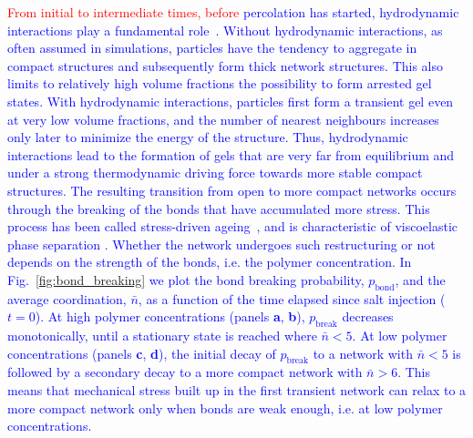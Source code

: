 \documentclass[preprint,amsmath,amssymb,superscriptaddress]{revtex4-1}
\begin{document}
\textcolor{blue}
{
\textcolor{red}{From initial to intermediate times, before} percolation has started, hydrodynamic interactions play a fundamental role~\cite{tanaka2000,tanaka2007spontaneous,furukawa2010key}.
Without hydrodynamic interactions, as often assumed in simulations, particles have the tendency to aggregate in compact structures and subsequently form thick network structures. This also limits to relatively high volume fractions the possibility to form arrested gel states. 
With hydrodynamic interactions, particles first form a transient gel even at very low volume fractions, and the number of nearest neighbours increases only later to minimize the energy of the structure. Thus, hydrodynamic interactions lead to the formation of gels that are very far from equilibrium and under a strong thermodynamic driving force towards more stable compact structures. The resulting transition from open to more compact networks occurs through the breaking of the bonds that have accumulated more stress. This process has been called stress-driven ageing~\cite{tanaka2007spontaneous}, and is characteristic of viscoelastic phase separation \cite{tanaka2000viscoelastic}. Whether the network undergoes such restructuring or not depends on the strength of the bonds, i.e. the polymer concentration.
In Fig.~\ref{fig:bond_breaking} we plot the bond breaking probability, $p_\text{bond}$, and the average coordination, $\bar{n}$, as a function of the time elapsed since salt injection ($t=0$).
At high polymer concentrations (panels \textbf{a}, \textbf{b}), $p_\text{break}$ decreases monotonically, until a stationary state is reached where $\bar{n}<5$.
At low polymer concentrations (panels \textbf{c}, \textbf{d}), the initial decay of $p_\text{break}$ to a network with $\bar{n}<5$ is followed by a secondary decay to a more compact network with $\bar{n}>6$. This means that mechanical stress built up in the first transient network can relax to a more compact network only when bonds are weak enough, i.e. at low polymer concentrations.
}
\end{document}
